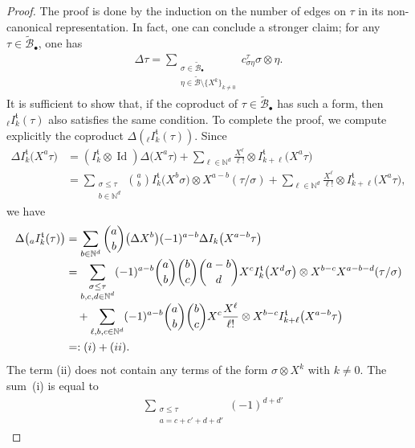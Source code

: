 \documentclass[11pt]{article}
\numberwithin{equation}{section}
\newcommand{\sbullet}{{\scriptscriptstyle\bullet}}
\theoremstyle{plain}
\theoremstyle{definition}
\DeclareMathOperator{\iden}{Id}
\newcommand{\bsmcB}{\boldsymbol{\mathcal{B}}}
\newcommand{\frkt}{\mathfrak{t}}
\newcommand{\bbN}{\mathbb{N}}
\newcommand{\mcB}{\mathcal{B}}
\begin{document}
\begin{proof}
The proof is done by the induction on the number of edges on $\tau$ in its non-canonical representation. In fact, one can conclude a stronger claim; for any $\tau\in\widetilde{\mcB}_\sbullet$, one has\vspace*{-3pt}
\begin{align}\label{eq:stronger than D}
\Delta\tau=\sum_{\substack{\sigma\in\widetilde{\mcB}_\sbullet\\ \eta\in \widetilde{\bsmcB}\setminus\{X^k\}_{k\neq0}}} c_{\sigma\eta}^\tau\sigma\otimes\eta.
\end{align}
It is sufficient to show that, if the coproduct of $\tau\in\widetilde{\mcB}_\sbullet$ has such a form, then ${}_{\ell}I_k^\frkt(\tau)$ also satisfies the same condition. To complete the proof, we compute explicitly the coproduct $\Delta( {}_{\ell}I_k^\frkt(\tau))$.
Since\vspace*{-3pt}
\begin{align*}
\Delta I_k^\frkt\bigl(X^a\tau\bigr)
&=(I_k^\frkt\otimes\iden)\Delta\bigl(X^a\tau\bigr)
+\sum_{\ell\in\bbN^d}\frac{X^{\ell}}{\ell!}\otimes I_{k+\ell}^\frkt\bigl(X^a\tau\bigr)\\
&=\sum_{\substack{\sigma\le\tau\\ b\in\bbN^d}}\binom{a}{b}
I_k^\frkt \bigl(X^b\sigma\bigr)\otimes X^{a-b}(\tau/\sigma)
+\sum_{\ell\in\bbN^d}\frac{X^{\ell}}{\ell!}\otimes I_{k+\ell}^\frkt\bigl(X^a\tau\bigr),
\end{align*}
we have\vspace*{-3pt}
\begin{align*}
\Delta\bigl({}_{a} I_k^\frkt(\tau)\bigr)
&=\sum_{b\in\bbN^d}\binom{a}{b}
\bigl(\Delta X^b\bigr)(-1)^{a-b}\Delta I_k\bigl(X^{a-b}\tau\bigr)\\[-3pt]
&=\sum_{\substack{\sigma\le\tau\\ b,c,d\in\bbN^d}}(-1)^{a-b}
\binom{a}{b}\binom{b}{c}\binom{a-b}{d}
X^c I_k^\frkt\bigl(X^d\sigma\bigr)
\otimes
X^{b-c} X^{a-b-d}(\tau/\sigma)\\[-3pt]
&\quad+\sum_{\ell,b,c\in\bbN^d}(-1)^{a-b}\binom{a}{b}\binom{b}{c}
X^c\frac{X^\ell}{\ell!}
\otimes
X^{b-c}I_{k+\ell}^\frkt\bigl(X^{a-b}\tau\bigr)\\
&=:(\textup{i})+(\textup{ii}).
\end{align*}
The term (ii) does not contain any terms of the form $\sigma\otimes X^k$ with $k\neq0$. The sum~(i) is equal to\vspace*{-3pt}
\begin{align*}
&\sum_{\substack{\sigma\le\tau \\ a=c+c'+d+d'}}(-1)^{d+d'}

\end{align*}
\end{proof}
\end{document}
